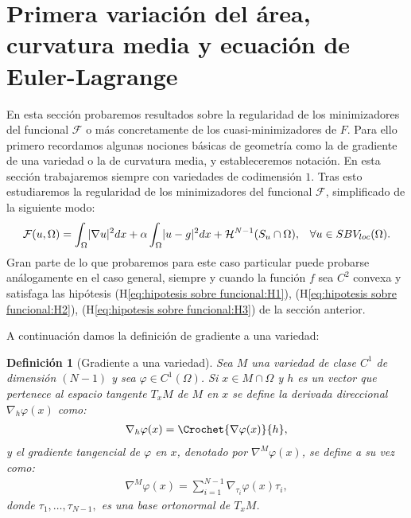 \documentclass[a4paper,11pt,spanish, twoside, leqno]{tfm-uam}
\newtheorem{defi}[teo]{Definición}
\begin{document}
\section{Primera variación del área, curvatura media y ecuación de Euler-Lagrange}

En esta sección probaremos resultados sobre la regularidad de los minimizadores del funcional $\mathcal{F}$ o más concretamente de los cuasi-minimizadores de $F$. Para ello primero recordamos algunas nociones básicas de geometría como la de gradiente de una variedad o la de curvatura media, y estableceremos notación. En esta sección trabajaremos siempre con variedades de codimensión $1$. Tras esto estudiaremos la regularidad de los minimizadores del funcional $\mathcal{F}$, simplificado de la siguiente modo:
\begin{align*}
\begin{array}{ll}
\displaystyle \mathcal{F}(u,\Omega)=\int_{\Omega}\lvert\nabla{u}\rvert^{2}dx+\alpha\int_{\Omega}\lvert u-g\rvert^{2}dx+\mathcal{H}^{N-1}(S_{u}\cap \Omega),& \forall u\in SBV_{loc}(\Omega).
\end{array}
\end{align*}
Gran parte de lo que probaremos para este caso particular puede probarse análogamente en el caso general, siempre y cuando la función $f$ sea $C^{2}$ convexa y satisfaga las hipótesis (H\ref{eq:hipotesis sobre funcional:H1}), (H\ref{eq:hipotesis sobre funcional:H2}), (H\ref{eq:hipotesis sobre funcional:H3}) de la sección anterior.

A continuación damos la definición de gradiente a una variedad:

\begin{defi}[Gradiente a una variedad] 
Sea $M$ una variedad de clase $C^{1}$ de dimensión $(N-1)$ y sea $\varphi\in C^{1}(\Omega)$. Si $x\in M\cap \Omega$ y $h$ es un vector que pertenece al espacio tangente $T_{x}M$ de $M$ en $x$ se define la derivada direccional $\nabla_{h}{\varphi(x)}$ como:
\begin{align*}
\nabla_{h}\varphi(x)=\Crochet{\nabla{\varphi(x)}}{h},
\end{align*}
y el gradiente tangencial de $\varphi$ en $x$, denotado por $\nabla^{M}\varphi(x)$, se define a su vez como:
\begin{align*}
\nabla^{M}\varphi(x)=\sum_{i=1}^{N-1}\nabla_{\tau_{i}}\varphi(x)\tau_{i},
\end{align*}
donde $\tau_{1},\ldots,\tau_{N-1},$ es una base ortonormal de $T_{x}M$.
\end{defi}
\end{document}
